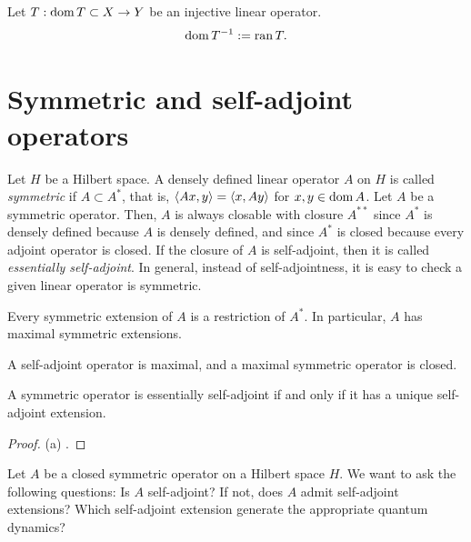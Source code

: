 \documentclass{../../large}
\begin{document}
\begin{prb}
\end{prb}

\begin{prb}
\end{prb}

\begin{prb}
Let $T:\operatorname{dom} T\subset X\to Y$ be an injective linear operator.
\[\operatorname{dom} T^{-1}:=\operatorname{ran} T.\]
\end{prb}



\section{Symmetric and self-adjoint operators}


\begin{prb}
Let $H$ be a Hilbert space.
A densely defined linear operator $A$ on $H$ is called \emph{symmetric} if $A\subset A^*$, that is, $\langle Ax,y\rangle=\langle x,Ay\rangle$ for $x,y\in\operatorname{dom} A$.
Let $A$ be a symmetric operator.
Then, $A$ is always closable with closure $A^{**}$ since $A^*$ is densely defined because $A$ is densely defined, and since $A^*$ is closed because every adjoint operator is closed.
If the closure of $A$ is self-adjoint, then it is called \emph{essentially self-adjoint}.
In general, instead of self-adjointness, it is easy to check a given linear operator is symmetric.
\begin{parts}
\item Every symmetric extension of $A$ is a restriction of $A^*$. In particular, $A$ has maximal symmetric extensions.
\item A self-adjoint operator is maximal, and a maximal symmetric operator is closed.
\item A symmetric operator is essentially self-adjoint if and only if it has a unique self-adjoint extension.
\end{parts}
\end{prb}
\begin{proof}
(a) .
\end{proof}


Let $A$ be a closed symmetric operator on a Hilbert space $H$.
We want to ask the following questions:
Is $A$ self-adjoint?
If not, does $A$ admit self-adjoint extensions?
Which self-adjoint extension generate the appropriate quantum dynamics?
\end{document}
